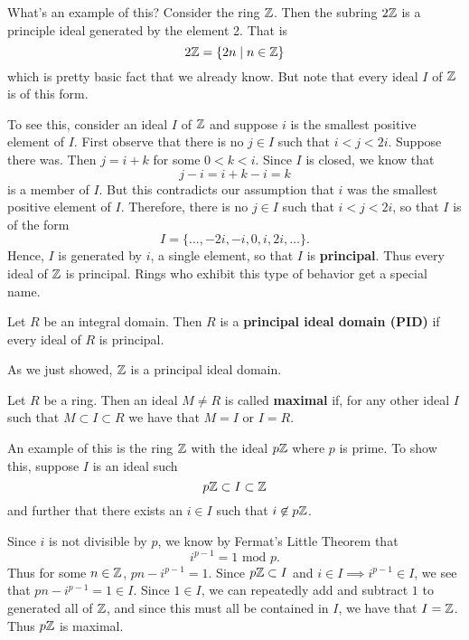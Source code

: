     What's an example of this? Consider the ring $\mathbb{Z}$. Then the
    subring $2\mathbb{Z}$ is a principle ideal generated by the element
    2. That is 
    \[
        2\mathbb{Z} = \{2n \mid n \in \mathbb{Z}\}
    \]
    which is pretty basic fact that we already know. But note that
    every ideal $I$ of $\mathbb{Z}$ is of this form. 

    \textcolor{NavyBlue}{To see this, consider an ideal $I$ of
    $\mathbb{Z}$ and suppose $i$ is the smallest positive element of $I$.
    First observe that there is no $j \in I$ such that $i < j <
    2i$. Suppose there was. Then $j = i + k$ for some $0 < k < i$.
    Since $I$ is closed, we know that 
    \[
        j - i = i + k - i = k   
    \]
    is a member of $I$. But this contradicts our assumption that
    $i$ was the smallest positive element of $I$. Therefore, there
    is no $j \in I$ such that $i < j < 2i$, so that $I$ is of the
    form 
    \[
        I = \{\dots, -2i, -i, 0, i, 2i, \dots\}.
    \]
    Hence, $I$ is generated by $i$, a single element, so that $I$
    is \textbf{principal}.
    }
    Thus every ideal of $\mathbb{Z}$ is principal. Rings who exhibit this
    type of behavior get a special name.  

    \begin{definition}
        Let $R$ be an integral domain. Then $R$ is a
        \textbf{principal ideal domain (PID)} if every ideal of
        $R$ is principal.
    \end{definition}
    As we just showed, $\mathbb{Z}$ is a principal ideal domain.

    \begin{definition}
        Let $R$ be a ring. Then an ideal $M \ne R$ is called
        \textbf{maximal} if, for any other ideal $I$ such that $M
        \subset I \subset R$ we have that $M = I$ or $I = R$. 
    \end{definition}

    An example of this is the ring $\mathbb{Z}$ with the ideal $p\mathbb{Z}$
    where $p$ is prime. To show this, suppose $I$ is an ideal such
    \[
        p\mathbb{Z} \subset I \subset \mathbb{Z}
    \]
    and further that there exists an $i \in I$ such that $i
    \not\in p\mathbb{Z}$. 

    Since $i$ is not divisible by $p$, we know by Fermat's Little
    Theorem that 
    \[ 
        i^{p-1} = 1 \mbox{ mod }p.
    \]
    Thus for some $n \in \mathbb{Z}$, $pn - i^{p-1} = 1.$ Since $p\mathbb{Z} \subset
    I$ and $i \in I \implies i^{p-1} \in I$, we see that $pn - i^{p-1} = 1 \in I$. Since $1 \in
    I$, we can repeatedly add and subtract $1$ to generated all of
    $\mathbb{Z}$, and since this must all be contained in $I$, we have that $I = \mathbb{Z}$. Thus $p\mathbb{Z}$ is maximal.

